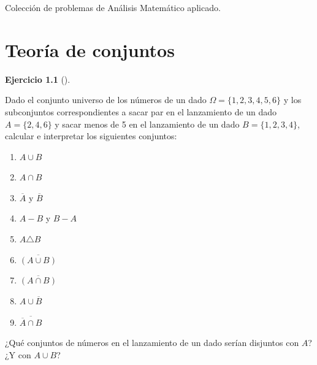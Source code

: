 \documentclass[
  a4paper,
]{scrreport}
\providecommand{\tightlist}{%
  \setlength{\itemsep}{0pt}\setlength{\parskip}{0pt}}\usepackage{longtable,booktabs,array}
\theoremstyle{definition}
\newtheorem{exercise}{Ejercicio}[chapter]
\theoremstyle{remark}
\begin{document}
Colección de problemas de Análisis Matemático aplicado.


\hypertarget{teoruxeda-de-conjuntos}{%
\chapter{Teoría de conjuntos}\label{teoruxeda-de-conjuntos}}

\leavevmode{}%
\begin{exercise}[]\label{exr-operaciones-conjuntos}

Dado el conjunto universo de los números de un dado
\(\Omega=\{1, 2, 3, 4, 5, 6\}\) y los subconjuntos correspondientes a
sacar par en el lanzamiento de un dado \(A=\{2, 4, 6\}\) y sacar menos
de 5 en el lanzamiento de un dado \(B=\{1, 2, 3, 4\}\), calcular e
interpretar los siguientes conjuntos:

\begin{enumerate}
\def\labelenumi{\alph{enumi}.}
\tightlist
\item
  \(A\cup B\)
\item
  \(A\cap B\)
\item
  \(\overline A\) y \(\overline B\)
\item
  \(A-B\) y \(B-A\)
\item
  \(A\triangle B\)
\item
  \(\overline{(A\cup B)}\)
\item
  \(\overline{(A\cap B)}\)
\item
  \(A\cup \overline B\)
\item
  \(\overline{\overline A \cap B}\)
\end{enumerate}

¿Qué conjuntos de números en el lanzamiento de un dado serían disjuntos
con \(A\)? ¿Y con \(A\cup B\)?

\end{exercise}
\end{document}
